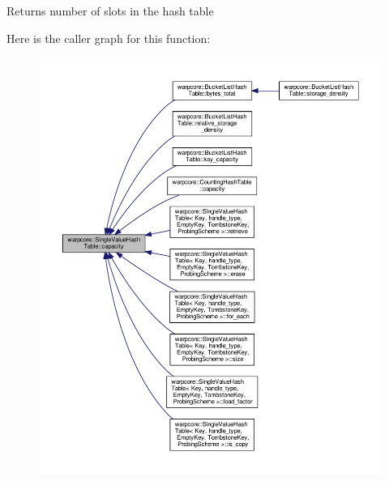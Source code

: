 \begin{DoxyReturn}{Returns}
number of slots in the hash table 
\end{DoxyReturn}
Here is the caller graph for this function\+:
\nopagebreak
\begin{figure}[H]
\begin{center}
\leavevmode
\includegraphics[width=350pt]{classwarpcore_1_1SingleValueHashTable_a9804486b8ec4f3c72293e19c722e4df2_icgraph}
\end{center}
\end{figure}
\mbox{\label{classwarpcore_1_1SingleValueHashTable_aaa4cf7e3252a0b177101fca437e5309e}} 
